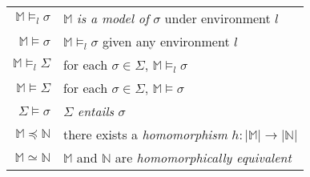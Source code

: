 \begin{tabular}{|r|l|}
		\hline
		$\mathbb{M} \models_l \sigma$    &  $\mathbb{M}$ \emph{is a model of} $\sigma$ under environment $l$        \\
		$\mathbb{M} \models \sigma$      &  $\mathbb{M} \models_l \sigma$ given any environment $l$                 \\
		$\mathbb{M} \models_l \Sigma$    &  for each $\sigma \in \Sigma$, $\mathbb{M} \models_l \sigma$             \\
		$\mathbb{M} \models \Sigma$      &  for each $\sigma \in \Sigma$, $\mathbb{M} \models \sigma$               \\
		\hline
		$\Sigma \models \sigma$          &  $\Sigma$ \emph{entails} $\sigma$                                        \\
		\hline
		$\mathbb{M} \preceq \mathbb{N}$  &  there exists a \emph{homomorphism} $h : |\mathbb{M}| \to |\mathbb{N}|$  \\
		$\mathbb{M} \simeq \mathbb{N}$   &  $\mathbb{M}$ and $\mathbb{N}$ are \emph{homomorphically equivalent}     \\
		\hline
	\end{tabular}
